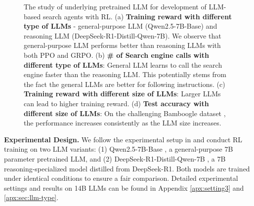 \begin{figure}[t]
    \centering
    
    \caption{
The study of underlying pretrained LLM for development of LLM-based search agents with RL. 
(a) \textbf{Training reward with different type of LLMs} - general-purpose LLM (Qwen2.5-7B-Base) and reasoning LLM (DeepSeek-R1-Distill-Qwen-7B). We observe that general-purpose LLM performs better than reasoning LLMs with both PPO and GRPO.
(b) \textbf{\# of Search engine calls with different type of LLMs}: General LLM learns to call the search engine faster than the reasoning LLM. This potentially stems from the fact the general LLMs are better for following instructions.
(c) \textbf{Training reward with different size of LLMs}: Larger LLMs can lead to higher training reward.
(d) \textbf{Test accuracy with different size of LLMs}: On the challenging Bamboogle dataset \cite{press2022measuring}, the performance increases consistently as the LLM size increases.
}\label{fig:scaling-LLM}

\end{figure}

\textbf{Experimental Design.}
We follow the experimental setup in \cite{jin2025search} and conduct RL training on two LLM variants:
(1) Qwen2.5-7B-Base \cite{yang2024qwen2}, a general-purpose 7B parameter pretrained LLM, and
(2) DeepSeek-R1-Distill-Qwen-7B \cite{guo2025deepseek}, a 7B reasoning-specialized model distilled from DeepSeek-R1.
Both models are trained under identical conditions to ensure a fair comparison.
Detailed experimental settings and results on 14B LLMs can be found in Appendix \ref{apx:setting3} and \ref{apx:sec:llm-type}.

